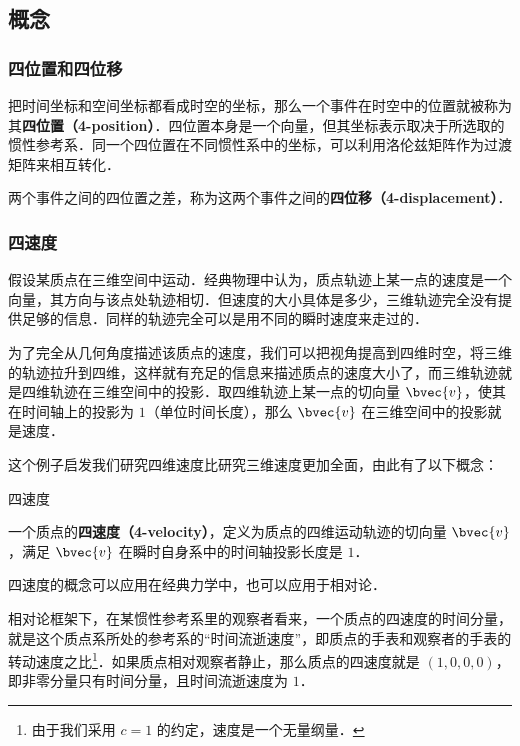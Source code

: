 
\subsection{概念}
\subsubsection{四位置和四位移}
把时间坐标和空间坐标都看成时空的坐标，那么一个事件在时空中的位置就被称为其\textbf{四位置（4-position）}．四位置本身是一个向量，但其坐标表示取决于所选取的惯性参考系．同一个四位置在不同惯性系中的坐标，可以利用洛伦兹矩阵作为过渡矩阵来相互转化．

两个事件之间的四位置之差，称为这两个事件之间的\textbf{四位移（4-displacement）}．

\subsubsection{四速度}

假设某质点在三维空间中运动．经典物理中认为，质点轨迹上某一点的速度是一个向量，其方向与该点处轨迹相切．但速度的大小具体是多少，三维轨迹完全没有提供足够的信息．同样的轨迹完全可以是用不同的瞬时速度来走过的．

为了完全从几何角度描述该质点的速度，我们可以把视角提高到四维时空，将三维的轨迹拉升到四维，这样就有充足的信息来描述质点的速度大小了，而三维轨迹就是四维轨迹在三维空间中的投影．取四维轨迹上某一点的切向量 $\bvec{v}$，使其在时间轴上的投影为 $1$（单位时间长度），那么 $\bvec{v}$ 在三维空间中的投影就是速度．

这个例子启发我们研究四维速度比研究三维速度更加全面，由此有了以下概念：

\begin{definition}{四速度}

一个质点的\textbf{四速度（4-velocity）}，定义为质点的四维运动轨迹的切向量 $\bvec{v}$，满足 $\bvec{v}$ 在瞬时自身系中的时间轴投影长度是 $1$． 

\end{definition}

四速度的概念可以应用在经典力学中，也可以应用于相对论．

相对论框架下，在某惯性参考系里的观察者看来，一个质点的四速度的时间分量，就是这个质点系所处的参考系的“时间流逝速度”，即质点的手表和观察者的手表的转动速度之比\footnote{由于我们采用 $c=1$ 的约定，速度是一个无量纲量．}．如果质点相对观察者静止，那么质点的四速度就是 $(1,0,0,0)$，即非零分量只有时间分量，且时间流逝速度为 $1$．


